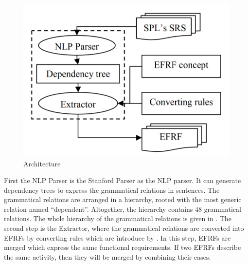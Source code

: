\begin{multicols*}{2}
		\begin{minipage}{0.9\linewidth}
			\centering
			\begin{figure}[H]
				\includegraphics[width=\linewidth]{Architecture}
				\caption{Architecture}
				\label{fig:cc}
			\end{figure}
		\end{minipage}
		
		First the NLP Parser is the Stanford Parser \cite{stanfordParser} as the NLP parser. It can generate dependency trees to express the
		grammatical relations in sentences. The grammatical relations are arranged in a hierarchy, rooted with the most generic relation named “dependent”. Altogether, the hierarchy
		contains 48 grammatical relations. The whole hierarchy of
		the grammatical relations is given in \cite{Marneffe}.
		The second step is the Extractor, where the grammatical relations are converted into \gls{EFRF}s by converting rules which are introduce by \cite{5381217}. In this step, \gls{EFRF}s are merged which express the
		same functional requirements. If two \gls{EFRF}s describe the same
		activity, then they will be merged by combining their cases. 
		
	\end{multicols*}


